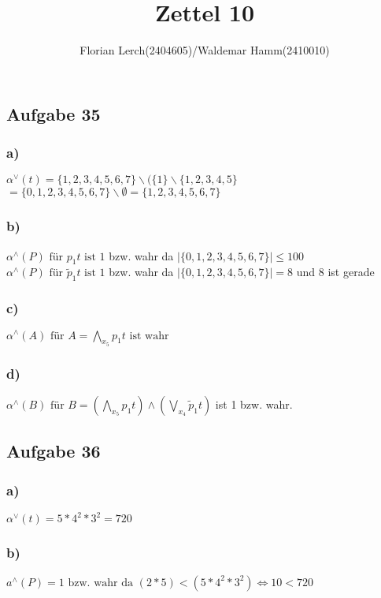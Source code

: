 \documentclass[11pt]{amsart}
\title{Zettel 10}
\author{Florian Lerch(2404605)/Waldemar Hamm(2410010)}
\begin{document}
\maketitle

\subsection*{Aufgabe 35}

\subsubsection*{a)}
\( \alpha^{\vee}(t) = \{1,2,3,4,5,6,7\} \backslash ( \{1\} \backslash \{1,2,3,4,5\} \) \\
\( = \{0,1,2,3,4,5,6,7\} \backslash \emptyset = \{1,2,3,4,5,6,7\} \)

\subsubsection*{b)}
\( \alpha^{\wedge}(P) \mbox{ für } p_1t \mbox{ ist } 1\) bzw. wahr da \( | \{0,1,2,3,4,5,6,7\} | \leq 100 \) \\
\( \alpha^{\wedge}(P) \mbox{ für } \tilde{p}_1t \mbox{ ist } 1\) bzw. wahr da \( | \{0,1,2,3,4,5,6,7\} | = 8\) und 8 ist gerade \\

\subsubsection*{c)}
\( \alpha^{\wedge}(A) \mbox{ für } A = \bigwedge_{x_5}p_1t \mbox{ ist wahr} \)

\subsubsection*{d)}
\( \alpha^{\wedge}(B) \mbox{ für } B = (\bigwedge_{x_5}p_1t)\wedge(\bigvee_{x_4}\tilde{p}_1t) \) ist 1 bzw. wahr.

\subsection*{Aufgabe 36}

\subsubsection*{a)}
\( \alpha^{\vee}(t) =  5*4^2*3^2 = 720 \)

\subsubsection*{b)}
\( a^{\wedge}(P) = 1 \mbox{ bzw. wahr da } (2 * 5) < (5 * 4^2 * 3^2) \Leftrightarrow 10 < 720 \)
\end{document}
